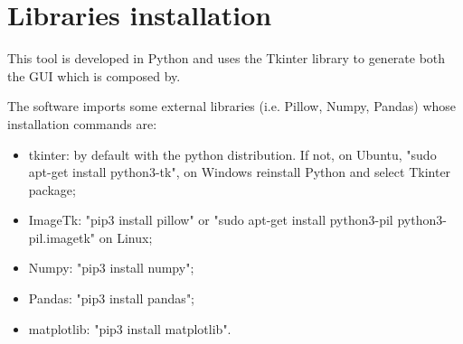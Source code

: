 \documentclass[preprint,12pt]{elsarticle}
\begin{document}
	\section{Libraries installation}
    	This tool is developed in Python and uses the Tkinter library to generate both the GUI which is composed by.

        The software imports some external libraries (i.e. Pillow, Numpy, Pandas) whose installation commands are:
        \begin{itemize}
            \item tkinter: by default with the python distribution. If not, on Ubuntu, "sudo apt-get install python3-tk", on Windows reinstall Python and select Tkinter package;
            \item ImageTk: "pip3 install pillow" or "sudo apt-get install python3-pil python3-pil.imagetk" on Linux;
            \item Numpy: "pip3 install numpy";
            \item Pandas: "pip3 install pandas";
            \item matplotlib: "pip3 install matplotlib".
        \end{itemize}
	\newpage
	
	
	
\end{document}
